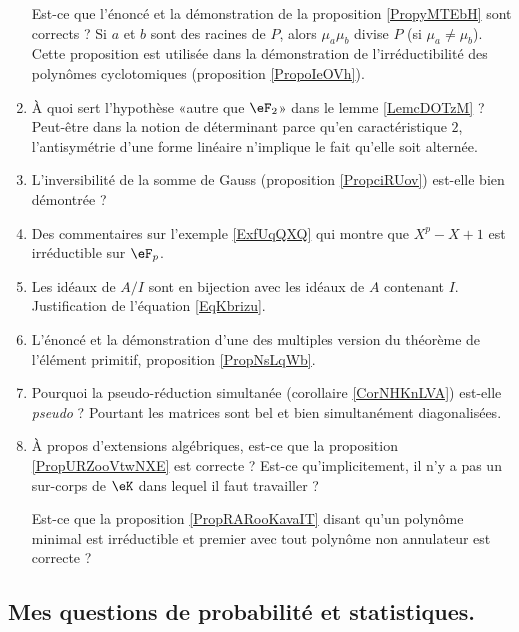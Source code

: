 \begin{enumerate}
        Est-ce que l'énoncé et la démonstration de la proposition \ref{PropyMTEbH} sont corrects ? Si \( a\) et \( b\) sont des racines de \( P\), alors \( \mu_a\mu_b\) divise \( P\) (si \( \mu_a\neq \mu_b\)). Cette proposition est utilisée dans la démonstration de l'irréductibilité des polynômes cyclotomiques (proposition \ref{PropoIeOVh}).
    \item
        À quoi sert l'hypothèse «autre que \( \eF_2\)» dans le lemme \ref{LemcDOTzM} ? Peut-être dans la notion de déterminant parce qu'en caractéristique \( 2\), l'antisymétrie d'une forme linéaire n'implique le fait qu'elle soit alternée.
    \item
        L'inversibilité de la somme de Gauss (proposition \ref{PropciRUov}) est-elle bien démontrée ?
    \item
        Des commentaires sur l'exemple \ref{ExfUqQXQ} qui montre que \( X^p-X+1\) est irréductible sur \( \eF_p\).
    \item
        Les idéaux de \( A/I\) sont en bijection avec les idéaux de \( A\) contenant \( I\). Justification de l'équation \eqref{EqKbrizu}.
    \item
        L'énoncé et la démonstration d'une des multiples version du théorème de l'élément primitif, proposition \ref{PropNsLqWb}.
    \item
        Pourquoi la pseudo-réduction simultanée (corollaire \ref{CorNHKnLVA}) est-elle \emph{pseudo} ? Pourtant les matrices sont bel et bien simultanément diagonalisées.
    \item
        À propos d'extensions algébriques, est-ce que la proposition \ref{PropURZooVtwNXE} est correcte ? Est-ce qu'implicitement, il n'y a pas un sur-corps de \( \eK\) dans lequel il faut travailler ?

        Est-ce que la proposition \ref{PropRARooKavaIT} disant qu'un polynôme minimal est irréductible et premier avec tout polynôme non annulateur est correcte ?
\end{enumerate}

\subsection{Mes questions de probabilité et statistiques.}

